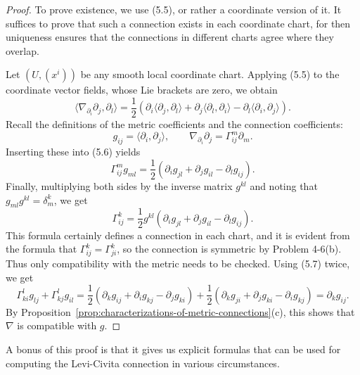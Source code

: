 \begin{theorem}
\begin{proof}
To prove existence, we use (5.5), or rather a coordinate version of it. It suffices to prove that such a connection exists in each coordinate chart, for then uniqueness ensures that the connections in different charts agree where they overlap.

Let $(U, (x^i))$ be any smooth local coordinate chart. Applying (5.5) to the coordinate vector fields, whose Lie brackets are zero, we obtain
\begin{equation}
\langle \nabla_{\partial_i} \partial_j, \partial_l \rangle = \frac{1}{2}\left(\partial_i \langle \partial_j, \partial_l \rangle + \partial_j \langle \partial_l, \partial_i \rangle - \partial_l \langle \partial_i, \partial_j \rangle\right). \tag{5.6}
\end{equation}
Recall the definitions of the metric coefficients and the connection coefficients:
\[
g_{ij} = \langle \partial_i, \partial_j \rangle, \qquad \nabla_{\partial_i} \partial_j = \Gamma^m_{ij} \partial_m.
\]
Inserting these into (5.6) yields
\begin{equation}
\Gamma^m_{ij} g_{ml} = \frac{1}{2}\left(\partial_i g_{jl} + \partial_j g_{il} - \partial_l g_{ij}\right). \tag{5.7}
\end{equation}
Finally, multiplying both sides by the inverse matrix $g^{kl}$ and noting that $g_{ml} g^{kl} = \delta^k_m$, we get
\begin{equation}
\Gamma^k_{ij} = \frac{1}{2} g^{kl}\left(\partial_i g_{jl} + \partial_j g_{il} - \partial_l g_{ij}\right). \tag{5.8}
\end{equation}
This formula certainly defines a connection in each chart, and it is evident from the formula that $\Gamma^k_{ij} = \Gamma^k_{ji}$, so the connection is symmetric by Problem 4-6(b). Thus only compatibility with the metric needs to be checked. Using (5.7) twice, we get
\[
\Gamma^l_{ki} g_{lj} + \Gamma^l_{kj} g_{il} = \frac{1}{2}\left(\partial_k g_{ij} + \partial_i g_{kj} - \partial_j g_{ki}\right) + \frac{1}{2}\left(\partial_k g_{ji} + \partial_j g_{ki} - \partial_i g_{kj}\right)
= \partial_k g_{ij}.
\]
By Proposition~\ref{prop:characterizations-of-metric-connections}(c), this shows that $\nabla$ is compatible with $g$.
\end{proof}
\end{theorem}

A bonus of this proof is that it gives us explicit formulas that can be used for computing the Levi-Civita connection in various circumstances.

